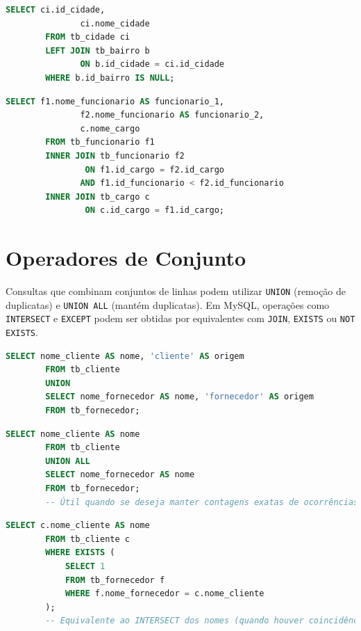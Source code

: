 \documentclass[
12pt,
a4paper,
semrecuonosumario,
sumario = abnt-6027-2012]{report}
\begin{document}
    \begin{lstlisting}[language=SQL,caption={SELECT -- Anti-join (LEFT + IS NULL): cidades sem bairros}]
        SELECT ci.id_cidade,
               ci.nome_cidade
        FROM tb_cidade ci
        LEFT JOIN tb_bairro b
               ON b.id_cidade = ci.id_cidade
        WHERE b.id_bairro IS NULL;
    \end{lstlisting}

    \begin{lstlisting}[language=SQL,caption={SELECT -- SELF JOIN: pares de funcionários do mesmo cargo}]
        SELECT f1.nome_funcionario AS funcionario_1,
               f2.nome_funcionario AS funcionario_2,
               c.nome_cargo
        FROM tb_funcionario f1
        INNER JOIN tb_funcionario f2
                ON f1.id_cargo = f2.id_cargo
               AND f1.id_funcionario < f2.id_funcionario
        INNER JOIN tb_cargo c
                ON c.id_cargo = f1.id_cargo;
    \end{lstlisting}


    \section{Operadores de Conjunto}

    Consultas que combinam conjuntos de linhas podem utilizar \texttt{UNION} (remoção de duplicatas) e \texttt{UNION ALL} (mantém duplicatas). Em MySQL, operações como \texttt{INTERSECT} e \texttt{EXCEPT} podem ser obtidas por equivalentes com \texttt{JOIN}, \texttt{EXISTS} ou \texttt{NOT EXISTS}.

    \begin{lstlisting}[language=SQL,caption={SELECT -- UNION: nomes de clientes e fornecedores sem duplicatas}]
        SELECT nome_cliente AS nome, 'cliente' AS origem
        FROM tb_cliente
        UNION
        SELECT nome_fornecedor AS nome, 'fornecedor' AS origem
        FROM tb_fornecedor;
    \end{lstlisting}

    \begin{lstlisting}[language=SQL,caption={SELECT -- UNION ALL: contabiliza todas as ocorrências (com duplicatas)}]
        SELECT nome_cliente AS nome
        FROM tb_cliente
        UNION ALL
        SELECT nome_fornecedor AS nome
        FROM tb_fornecedor;
        -- Útil quando se deseja manter contagens exatas de ocorrências
    \end{lstlisting}

    \begin{lstlisting}[language=SQL,caption={SELECT -- INTERSECT (equivalente): nomes presentes em cliente e fornecedor}]
        SELECT c.nome_cliente AS nome
        FROM tb_cliente c
        WHERE EXISTS (
            SELECT 1
            FROM tb_fornecedor f
            WHERE f.nome_fornecedor = c.nome_cliente
        );
        -- Equivalente ao INTERSECT dos nomes (quando houver coincidência literal)
    \end{lstlisting}
\end{document}
